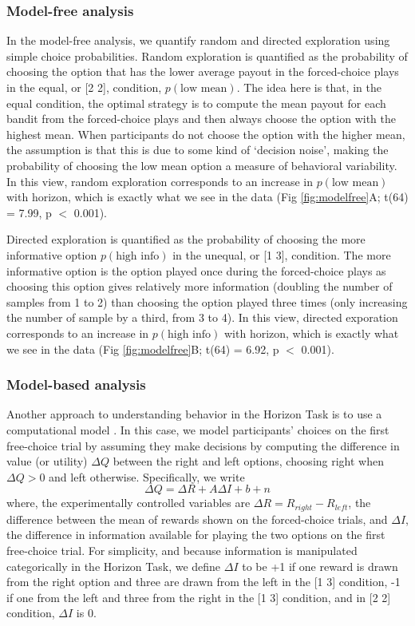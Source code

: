 \documentclass[12pt]{article}
\begin{document}
{	\subsubsection*{Model-free analysis}
	In the model-free analysis, we quantify random and directed exploration using simple choice probabilities. Random exploration is quantified as the probability of choosing the option that has the lower average payout in the forced-choice plays in the equal, or [2 2], condition, $p(\mbox{low mean})$. The idea here is that, in the equal condition, the optimal strategy is to compute the mean payout for each bandit from the forced-choice plays and then always choose the option with the highest mean. When participants do not choose the option with the higher mean, the assumption is that this is due to some kind of `decision noise', making the probability of choosing the low mean option a measure of behavioral variability. In this view, random exploration corresponds to an increase in $p(\mbox{low mean})$ with horizon, which is exactly what we see in the data (Fig \ref{fig:modelfree}A; t(64) = 7.99, p $<$ 0.001).
	
	Directed exploration is quantified as the probability of choosing the more informative option $p(\mbox{high info})$ in the unequal, or [1 3], condition. The more informative option is the option played once during the forced-choice plays as choosing this option gives relatively more information (doubling the number of samples from 1 to 2) than choosing the option played three times (only increasing the number of sample by a third, from 3 to 4). In this view, directed exporation corresponds to an increase in $p(\mbox{high info})$ with horizon, which is exactly what we see in the data (Fig \ref{fig:modelfree}B; t(64) = 6.92, p $<$ 0.001).
	
	\subsubsection*{Model-based analysis}	
	Another approach to understanding behavior in the Horizon Task is to use a computational model \citep{wilson2014}. In this case, we model  participants' choices on the first free-choice trial by assuming they make decisions by computing the difference in value (or utility) $\Delta Q$ between the right and left options, choosing right when $\Delta Q > 0$ and left otherwise.  Specifically, we write
	\begin{equation}
		\label{eq:origmodel}
		\Delta Q= \Delta R+A \Delta I+b+n
	\end{equation}
	where, the experimentally controlled variables are $\Delta R=R_{right}-R_{left}$, the difference between the mean of rewards shown on the forced-choice trials, and $\Delta I$, the difference in information available for playing the two options on the first free-choice trial. For simplicity, and because information is manipulated categorically in the Horizon Task, we define $\Delta I$ to be +1 if one reward is drawn from the right option and three are drawn from the left in the [1 3] condition, -1 if one from the left and three from the right in the [1 3] condition, and in [2 2] condition, $\Delta I$ is 0. 
	
}
\end{document}
